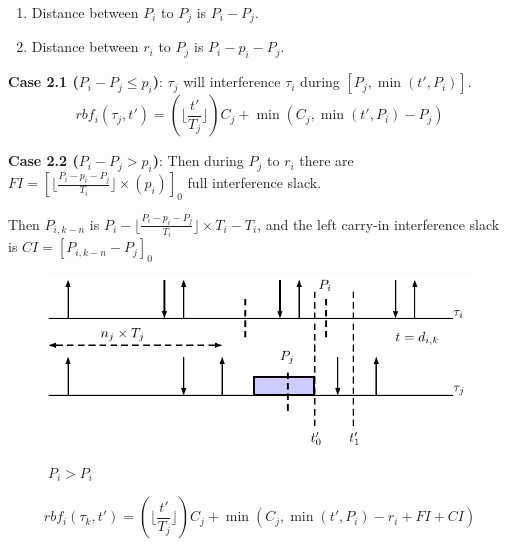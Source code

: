 \documentclass[12pt,conference,onecolumn]{IEEEtran}
\begin{document}


\begin{enumerate}
	\item Distance between $P_i$ to $P_j$ is $P_i-P_j$. 
	\item Distance between $r_i$ to $P_j$ is $P_i-p_i-P_j$.
\end{enumerate}



{
\textbf{Case 2.1 ($P_i-P_j\leq p_i$)}: $\tau_j$ will  interference  $\tau_i$ during $[P_j,\min(t', P_i)]$.
	\begin{equation}
		rbf_i(\tau_j,t')=(\lfloor \frac{t'}{T_j} \rfloor) C_j+\min\left(C_j,\min(t', P_i)-P_j\right)
	\end{equation}


\textbf{Case 2.2 ($P_i- P_j>p_i $)}: Then during $P_j$ to $r_i$ there are $FI=[\lfloor \frac{P_i-p_i-P_j}{T_i}\rfloor \times (p_i)]_0$ full interference slack.

Then $P_{i,k-n}$ is $P_i-\lfloor \frac{P_i- p_i-P_j}{T_i} \rfloor \times T_i-T_i$, and the left carry-in interference slack is $CI=[P_{i,k-n}-P_j]_0$
} 

	\begin{figure}[h!]
 \centering
\includegraphics[scale=1]{Figure/C4}  
\caption{$ P_i>P_i$}
  \label{fig:p3}
\end{figure}


\begin{equation}
		rbf_i(\tau_k,t')=(\lfloor \frac{t'}{T_j} \rfloor) C_j+\min(C_j, \min(t', P_i)-r_{i}+FI+CI)
\end{equation}
\end{document}
